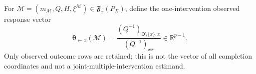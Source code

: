 For \(\mathcal M=(m_{\mathcal M},Q,H,\xi^{\mathcal M})\in\mathfrak F_x(P_X)\), define the one-intervention observed response vector
\[
\boldsymbol\theta_{\leftarrow x}(\mathcal M)
=\frac{(Q^{-1})_{\mathsf O\setminus\{x\},x}}{(Q^{-1})_{xx}}
\in\mathbb R^{p-1}.
\]
Only observed outcome rows are retained; this is not the vector of all completion coordinates and not a joint-multiple-intervention estimand.